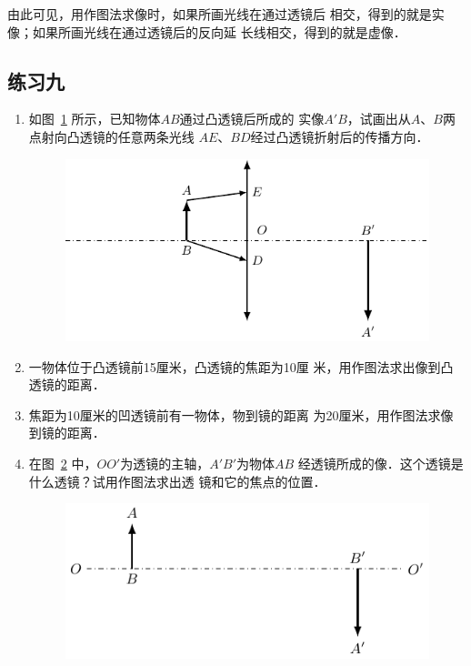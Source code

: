 由此可见，用作图法求像时，如果所画光线在通过透镜后
相交，得到的就是实像；如果所画光线在通过透镜后的反向延
长线相交，得到的就是虚像．


\subsection*{练习九}
\begin{enumerate}
\item 如图~\ref{fig_C_5-45} 所示，已知物体$AB$通过凸透镜后所成的
实像$A'B$，试画出从$A$、$B$两点射向凸透镜的任意两条光线
$AE$、$BD$经过凸透镜折射后的传播方向．
\begin{figure}[htbp]
    \centering
    \includegraphics{fig/C/5-45.pdf}
    \caption{}\label{fig_C_5-45}
\end{figure}

\item 一物体位于凸透镜前15厘米，凸透镜的焦距为10厘
米，用作图法求出像到凸透镜的距离．
\item 焦距为10厘米的凹透镜前有一物体，物到镜的距离
为20厘米，用作图法求像到镜的距离．
\item 在图~\ref{fig_C_5-46} 中，$OO'$为透镜的主轴，$A'B'$为物体$AB$
经透镜所成的像．这个透镜是什么透镜？试用作图法求出透
镜和它的焦点的位置．                    
\begin{figure}[htbp]
    \centering
    \includegraphics{fig/C/5-46.pdf}
    \caption{}\label{fig_C_5-46}
\end{figure}
\end{enumerate}

